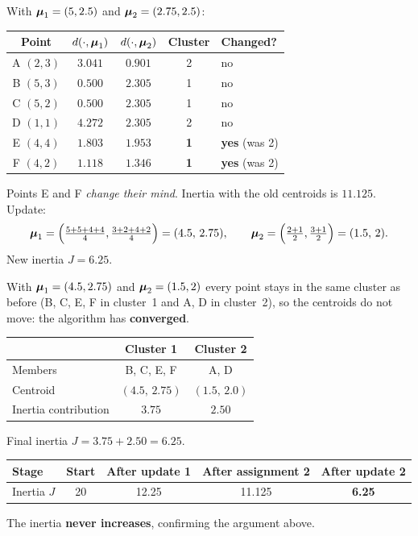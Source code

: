 \begin{example}[: Iteration 2]
With $\boldsymbol{\mu}_1=(5,2.5)$ and $\boldsymbol{\mu}_2=(2.75,2.5)$:

\begin{center}
\begin{tabular}{@{}c|cc|c|l@{}}
\toprule
Point & $d(\cdot,\boldsymbol{\mu}_1)$ & $d(\cdot,\boldsymbol{\mu}_2)$ & Cluster & Changed?\\
\midrule
A $(2,3)$ & $3.041$ & $0.901$ & 2 & no\\
B $(5,3)$ & $0.500$ & $2.305$ & 1 & no\\
C $(5,2)$ & $0.500$ & $2.305$ & 1 & no\\
D $(1,1)$ & $4.272$ & $2.305$ & 2 & no\\
E $(4,4)$ & $1.803$ & $1.953$ & \textbf{1} & \textbf{yes} (was 2)\\
F $(4,2)$ & $1.118$ & $1.346$ & \textbf{1} & \textbf{yes} (was 2)\\
\bottomrule
\end{tabular}
\end{center}
Points E and F \emph{change their mind}. Inertia with the old centroids is $11.125$. Update:
\[
  \boldsymbol{\mu}_1=\Big(\tfrac{5+5+4+4}{4},\tfrac{3+2+4+2}{4}\Big)=(4.5,\,2.75),\qquad
  \boldsymbol{\mu}_2=\Big(\tfrac{2+1}{2},\tfrac{3+1}{2}\Big)=(1.5,\,2).
\]
New inertia $J=\mathbf{6.25}$.
\end{example}

\begin{example}
With $\boldsymbol{\mu}_1=(4.5,2.75)$ and $\boldsymbol{\mu}_2=(1.5,2)$ every point stays in the same cluster as before (B, C, E, F in cluster~1 and A, D in cluster~2), so the centroids do not move: the algorithm has \textbf{converged}.

\medskip
\begin{center}
\begin{tabular}{@{}lcc@{}}
\toprule
 & \textbf{Cluster 1} & \textbf{Cluster 2}\\
\midrule
Members & B, C, E, F & A, D\\
Centroid & $(4.5,\,2.75)$ & $(1.5,\,2.0)$\\
Inertia contribution & $3.75$ & $2.50$\\
\bottomrule
\end{tabular}
\end{center}
Final inertia $J=3.75+2.50=\mathbf{6.25}$.
\end{example}

\begin{center}
\begin{tabular}{@{}lcccc@{}}
\toprule
\textbf{Stage} & Start & After update 1 & After assignment 2 & After update 2\\
\midrule
Inertia $J$ & 20 & 12.25 & 11.125 & \textbf{6.25}\\
\bottomrule
\end{tabular}
\end{center}
The inertia \textbf{never increases}, confirming the argument above.

